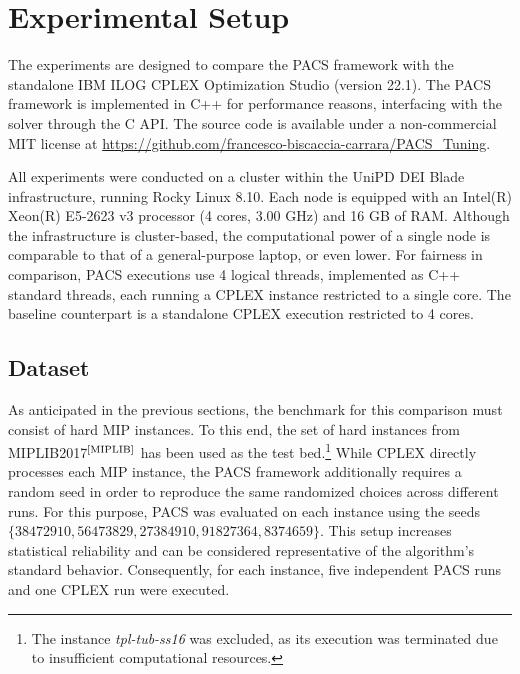 \section{Experimental Setup}
The experiments are designed to compare the PACS framework with the standalone IBM ILOG CPLEX Optimization Studio (version 22.1).  
The PACS framework is implemented in C++ for performance reasons, interfacing with the solver through the C API. The source code is available under a non-commercial MIT license at \url{https://github.com/francesco-biscaccia-carrara/PACS_Tuning}. 

All experiments were conducted on a cluster within the UniPD DEI Blade infrastructure, running Rocky Linux 8.10. Each node is equipped with an Intel(R) Xeon(R) E5-2623 v3 processor (4 cores, 3.00 GHz) and 16 GB of RAM. Although the infrastructure is cluster-based, the computational power of a single node is comparable to that of a general-purpose laptop, or even lower.  
For fairness in comparison, PACS executions use 4 logical threads, implemented as C++ standard threads, each running a CPLEX instance restricted to a single core. The baseline counterpart is a standalone CPLEX execution restricted to 4 cores.

\subsection{Dataset}
As anticipated in the previous sections, the benchmark for this comparison must consist of hard MIP instances. To this end, the set of hard instances from MIPLIB2017$^\text{\cite{MIPLIB}}$ has been used as the test bed.\footnote{The instance \textit{tpl-tub-ss16} was excluded, as its execution was terminated due to insufficient computational resources.}  
While CPLEX directly processes each MIP instance, the PACS framework additionally requires a random seed in order to reproduce the same randomized choices across different runs. For this purpose, PACS was evaluated on each instance using the seeds $\{38472910, 56473829, 27384910, 91827364, 8374659\}$. This setup increases statistical reliability and can be considered representative of the algorithm’s standard behavior.  
Consequently, for each instance, five independent PACS runs and one CPLEX run were executed.

